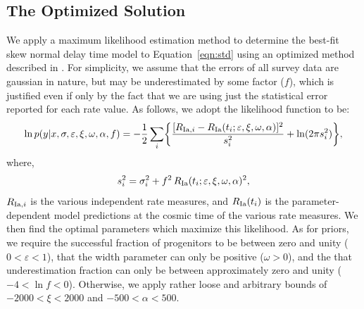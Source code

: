 \documentclass[apj]{aastex62}
\begin{document}
\subsection{The Optimized Solution\label{sec:optimized_soln}}
We apply a maximum likelihood estimation method to determine the best-fit skew normal delay time model to Equation~\ref{eqn:std} using an optimized method described in \cite{Hogg:2010fj}. For simplicity, we assume that the errors of all survey data are gaussian in nature, but may be underestimated by some factor ($f$), which is justified even if only by the fact that we are using just the statistical error reported for each rate value.  As follows, we adopt the likelihood function to be:
\begin{equation}
\ln p(y|x, \sigma, \varepsilon, \xi, \omega, \alpha, f) = -\frac{1}{2} \sum_i \biggl\{ \frac{[R_{{\rm Ia},i} - R_{\rm Ia}(t_i; \varepsilon, \xi, \omega, \alpha)]^2}{s_i^2}+\ln (2\pi s_i^2)\biggr\},
	\label{eqn:lf}
\end{equation}
where,
\begin{equation}
s_i^2 = \sigma_i^2+f^2\, R_{\rm Ia}(t_i; \varepsilon, \xi, \omega, \alpha)^2,
\end{equation}
\noindent $R_{{\rm Ia},i}$ is the various independent rate measures, and $R_{\rm Ia}(t_i)$ is the parameter-dependent model predictions at the cosmic time of the various rate measures. We then find the optimal parameters which maximize this likelihood. As for priors, we require the successful fraction of progenitors to be between zero and unity ($0<\varepsilon<1$), that the width parameter can only be positive ($\omega>0$), and the that underestimation fraction can only be between approximately zero and unity ($-4<\ln f<0$). Otherwise, we apply rather loose and arbitrary bounds of $-2000<\xi<2000$ and  $-500 < \alpha < 500$. 
\end{document}
